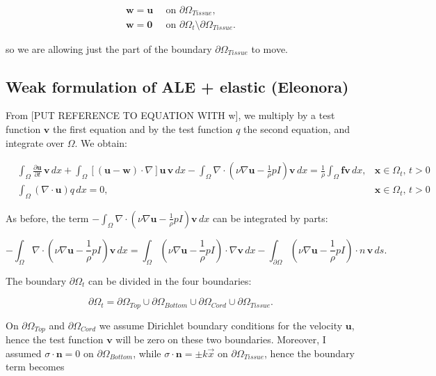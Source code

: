 \documentclass[11pt,a4paper,titlepage]{report}
\begin{document}
\[
\begin{aligned}
\mathbf{w = u} \, & \text{ on } \partial \Omega_{Tissue}, \\
\mathbf{w = 0} \, & \text{ on } \partial \Omega_t \setminus \partial \Omega_{Tissue}.
\end{aligned}
\]

so we are allowing just the part of the boundary $\partial \Omega_{Tissue}$ to move.

\subsection{Weak formulation of  ALE + elastic (Eleonora)}

From [PUT REFERENCE TO EQUATION WITH w], we multiply by a test function $\mathbf{v}$ the first equation and by the test function $q$ the second equation, and integrate over $\Omega$. We obtain:


\[
\begin{aligned}
& \int_{\Omega} \frac{\partial \mathbf{u}}{\partial t} \, \mathbf{v} \, dx
+ \int_{\Omega} [(\mathbf{u - w}) \cdot \nabla] \mathbf{u} \, \mathbf{v} \, dx
- \int_{\Omega} \nabla \cdot (\nu \nabla \mathbf{u} -  \frac{1}{\rho}  pI)\mathbf{v} \, dx
=  \frac{1}{\rho} \int_{\Omega} \mathbf{f} \mathbf{v} \, dx,  & \mathbf{x} \in \Omega_t, \, t>0 \\
& \int_{\Omega}  (\nabla \cdot \mathbf{u}) q \, dx = 0 , & \mathbf{x} \in \Omega_t, \, t>0
\end{aligned}
\]


As before, the term $- \int_{\Omega} \nabla \cdot (\nu \nabla \mathbf{u} -   \frac{1}{\rho}  pI)\mathbf{v} \, dx$ can be integrated by parts:

\[
- \int_{\Omega} \nabla \cdot (\nu \nabla \mathbf{u} -  \frac{1}{\rho} pI)\mathbf{v} \, dx =  \int_{\Omega} (\nu \nabla \mathbf{u} -  \frac{1}{\rho}  pI) \cdot \nabla \mathbf{v} \, dx - \int_{\partial \Omega} (\nu \nabla \mathbf{u} -  \frac{1}{\rho}  pI) \cdot n \, \mathbf{v} \, ds.
\]

The boundary $\partial \Omega_t$ can be divided in the four boundaries:

\[
\partial \Omega_t= \partial \Omega_{Top} \cup \partial \Omega_{Bottom} \cup \partial \Omega_{Cord} \cup  \partial \Omega_{Tissue}.
\]

On $\partial \Omega_{Top}$ and $\partial \Omega_{Cord}$ we assume Dirichlet boundary conditions for the velocity $\mathbf{u}$, hence the test function $\mathbf{v}$ will be zero on these two boundaries. Moreover, I assumed $\sigma \cdot \mathbf{n} = 0$ on $\partial \Omega_{Bottom}$, while $\sigma \cdot \mathbf{n} = \pm k \vec{x} $ on $\partial \Omega_{Tissue}$, hence the boundary term becomes
\end{document}

